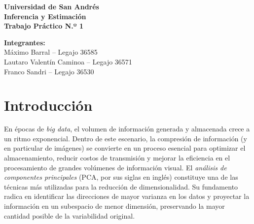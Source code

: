 \documentclass[12pt]{article}
\begin{document}
\thispagestyle{empty}

\thispagestyle{empty}
\begin{center}
    \vspace*{\fill}

    {\Large \textbf{Universidad de San Andrés}}\\[0.8cm]

    {\Huge \textbf{Inferencia y Estimación}}\\[0.6cm]
    {\LARGE \textbf{Trabajo Práctico N.º 1}}\\[1.5cm]


    \vspace{1.6cm}

    {\large \textbf{Integrantes:}}\\[0.4cm]
    {\large Máximo Barral -- Legajo 36585}\\[0.2cm]
    {\large Lautaro Valentín Caminoa -- Legajo 36571}\\[0.2cm]
    {\large Franco Sandri -- Legajo 36530}\\[1.4cm]

    \vspace*{\fill}
\end{center}
\newpage

\setcounter{page}{1}    %
\pagestyle{plain}       %

\section{Introducción}
En épocas de \textit{big data}, el volumen de información generada y almacenada crece a un ritmo exponencial. Dentro de este escenario, la compresión de información (y en particular de imágenes) se convierte en un proceso esencial para optimizar el almacenamiento, reducir costos de transmisión y mejorar la eficiencia en el procesamiento de grandes volúmenes de información visual. El \textit{análisis de componentes principales} (PCA, por sus siglas en inglés) constituye una de las técnicas más utilizadas para la reducción de dimensionalidad. Su fundamento radica en identificar las direcciones de mayor varianza en los datos y proyectar la información en un subespacio de menor dimensión, preservando la mayor cantidad posible de la variabilidad original. 
\end{document}
